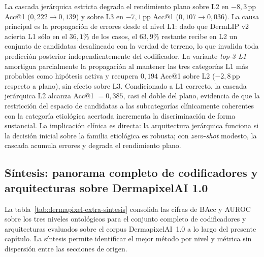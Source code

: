 La cascada jerárquica estricta degrada el rendimiento plano sobre
L2 en $-8{,}3$\,pp Acc@1 ($0{,}222 \to 0{,}139$) y sobre L3 en
$-7{,}1$\,pp Acc@1 ($0{,}107 \to 0{,}036$). La causa
principal es la propagación de errores desde el nivel L1: dado que
DermLIP v2 acierta L1 sólo en el $36{,}1\%$ de los casos, el
$63{,}9\%$ restante recibe en L2 un conjunto de candidatas
desalineado con la verdad de terreno, lo que invalida toda
predicción posterior independientemente del codificador. La
variante \emph{top-3 L1} amortigua parcialmente la propagación al
mantener las tres categorías L1 más probables como hipótesis activa
y recupera $0{,}194$ Acc@1 sobre L2 ($-2{,}8$\,pp respecto a
plano), sin efecto sobre L3. Condicionado a L1 correcto, la
cascada jerárquica L2 alcanza Acc@1 $= 0{,}385$, casi el doble
del plano, evidencia de que la restricción del espacio de
candidatas a las subcategorías clínicamente coherentes con la
categoría etiológica acertada incrementa la discriminación de
forma sustancial. La implicación clínica es directa: la arquitectura
jerárquica funciona si la decisión inicial sobre la familia
etiológica es robusta; con \emph{zero-shot} modesto, la cascada
acumula errores y degrada el rendimiento plano.

\subsection*{Síntesis: panorama completo de codificadores y
arquitecturas sobre DermapixelAI 1.0}
\label{sec:dermapixel-extra-sintesis}

La tabla~\ref{tab:dermapixel-extra-sintesis} consolida las cifras
de BAcc y AUROC sobre los tres niveles ontológicos para el conjunto
completo de codificadores y arquitecturas evaluados sobre el corpus
DermapixelAI~1.0 a lo largo del presente capítulo. La síntesis
permite identificar el mejor método por nivel y métrica sin
dispersión entre las secciones de origen.

